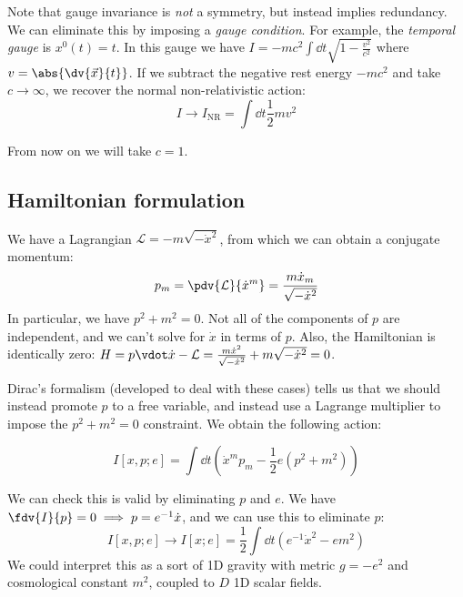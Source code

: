 \documentclass{jknotes}
\begin{document}
Note that gauge invariance is \emph{not} a symmetry, but instead implies redundancy. We can eliminate this by imposing a \emph{gauge condition}. For example, the \emph{temporal gauge} is \(x^0(t) = t\). In this gauge we have \(I = -mc^2\int\dd{t}\sqrt{1 - \frac{v^2}{c^2}}\) where \(v = \abs{\dv{\vec{x}}{t}}\). If we subtract the negative rest energy \(-mc^2\) and take \(c\rightarrow\infty\), we recover the normal non-relativistic action:
\begin{equation}
    I \rightarrow I_{\text{NR}} = \int\dd{t} \frac{1}{2}mv^2
\end{equation}

From now on we will take \(c = 1\).

\subsection{Hamiltonian formulation}
We have a Lagrangian \(\mathcal{L} = -m \sqrt{-\dot{x}^2}\), from which we can obtain a conjugate momentum:
\begin{equation}
    p_m = \pdv{\mathcal{L}}{\dot{x}^m} = \frac{m\dot{x}_m}{\sqrt{-\dot{x}^2}}
\end{equation}
In particular, we have \(p^2+m^2 = 0\). Not all of the components of \(p\) are independent, and we can't solve for \(\dot{x}\) in terms of \(p\). Also, the Hamiltonian is identically zero: \(H = p\vdot\dot{x}-\mathcal{L} = \frac{m\dot{x}^2}{\sqrt{-\dot{x}^2}} + m\sqrt{-\dot{x}^2} = 0\). 

Dirac's formalism (developed to deal with these cases) tells us that we should instead promote \(p\) to a free variable, and instead use a Lagrange multiplier to impose the \(p^2+m^2 = 0\) constraint. We obtain the following action:

\begin{equation}
    I[x,p;e] = \int\dd{t}\left( \dot{x}^mp_m - \frac{1}{2}e(p^2+m^2) \right)
    \tag{\(*\)}
    \label{witheinbein}
\end{equation}

We can check this is valid by eliminating \(p\) and \(e\). We have \(\fdv{I}{p}=0 \implies p = e^{-1}\dot{x}\), and we can use this to eliminate \(p\):
\begin{equation}
    I[x,p;e] \rightarrow I[x;e] = \frac{1}{2}\int\dd{t}\left( e^{-1}\dot{x}^2 - em^2 \right)
\end{equation}
We could interpret this as a sort of 1D gravity with metric \(g = -e^2\) and cosmological constant \(m^2\), coupled to \(D\) 1D scalar fields.
\end{document}
